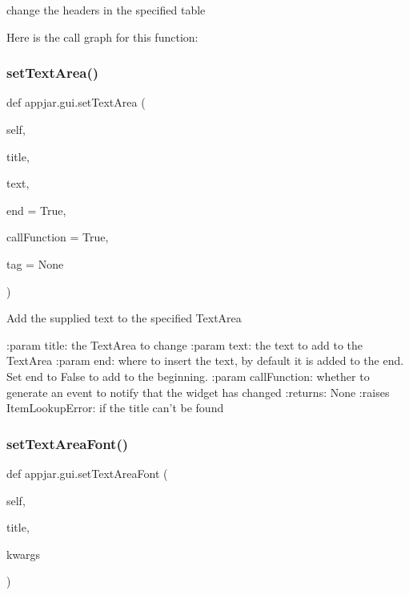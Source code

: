 \begin{DoxyVerb}
\begin{DoxyVerb}change the headers in the specified table \end{DoxyVerb}
 Here is the call graph for this function\+:
\mbox{\label{classappjar_1_1gui_a4ccd58e1021485bdbdb1a15bc6e9afb2}} 
\subsubsection{\texorpdfstring{set\+Text\+Area()}{setTextArea()}}
{\footnotesize\ttfamily def appjar.\+gui.\+set\+Text\+Area (\begin{DoxyParamCaption}\item[{}]{self,  }\item[{}]{title,  }\item[{}]{text,  }\item[{}]{end = {\ttfamily True},  }\item[{}]{call\+Function = {\ttfamily True},  }\item[{}]{tag = {\ttfamily None} }\end{DoxyParamCaption})}

\begin{DoxyVerb}Add the supplied text to the specified TextArea

:param title: the TextArea to change
:param text: the text to add to the TextArea
:param end: where to insert the text, by default it is added to the end. Set end to False to add to the beginning.
:param callFunction: whether to generate an event to notify that the widget has changed
:returns: None
:raises ItemLookupError: if the title can't be found
\end{DoxyVerb}
 \mbox{\label{classappjar_1_1gui_abbd1a46a2540c6978dbc155158cf46ec}} 
\subsubsection{\texorpdfstring{set\+Text\+Area\+Font()}{setTextAreaFont()}}
{\footnotesize\ttfamily def appjar.\+gui.\+set\+Text\+Area\+Font (\begin{DoxyParamCaption}\item[{}]{self,  }\item[{}]{title,  }\item[{}]{kwargs }\end{DoxyParamCaption})}


\end{DoxyVerb}
